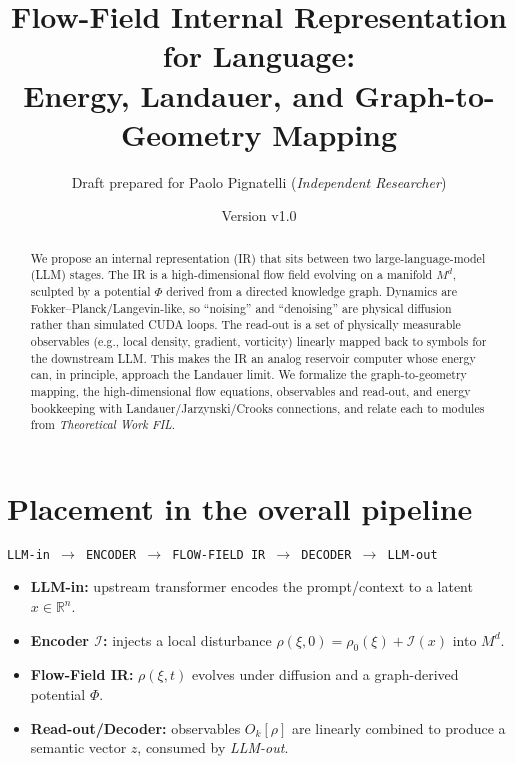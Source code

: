 \documentclass[11pt]{article}
\title{\textbf{Flow-Field Internal Representation for Language:}\\ Energy, Landauer, and Graph-to-Geometry Mapping}
\author{Draft prepared for Paolo Pignatelli (\emph{Independent Researcher})}
\date{Version v1.0}
\newcommand{\R}{\mathbb{R}}
\newcommand{\manifold}{M^d}
\begin{document}
\maketitle
\begin{abstract}
We propose an internal representation (IR) that sits between two large-language-model (LLM) stages. The IR is a high-dimensional flow field evolving on a manifold $\manifold$, sculpted by a potential $\Phi$ derived from a directed knowledge graph. Dynamics are Fokker--Planck/Langevin-like, so ``noising'' and ``denoising'' are physical diffusion rather than simulated CUDA loops. The read-out is a set of physically measurable observables (e.g., local density, gradient, vorticity) linearly mapped back to symbols for the downstream LLM. This makes the IR an analog reservoir computer whose energy can, in principle, approach the Landauer limit. We formalize the graph-to-geometry mapping, the high-dimensional flow equations, observables and read-out, and energy bookkeeping with Landauer/Jarzynski/Crooks connections, and relate each to modules from \emph{Theoretical Work FIL}.
\end{abstract}
\section{Placement in the overall pipeline}
\begin{center}
\texttt{LLM-in $\to$ ENCODER $\to$ FLOW-FIELD IR $\to$ DECODER $\to$ LLM-out}
\end{center}
\begin{itemize}[leftmargin=2em]
  \item \textbf{LLM-in:} upstream transformer encodes the prompt/context to a latent $x\in\R^n$.
  \item \textbf{Encoder $\mathcal{I}$:} injects a local disturbance $\rho(\xi,0)=\rho_0(\xi)+\mathcal{I}(x)$ into $\manifold$.
  \item \textbf{Flow-Field IR:} $\rho(\xi,t)$ evolves under diffusion and a graph-derived potential $\Phi$.
  \item \textbf{Read-out/Decoder:} observables $O_k[\rho]$ are linearly combined to produce a semantic vector $z$, consumed by \emph{LLM-out}.
\end{itemize}
\end{document}
